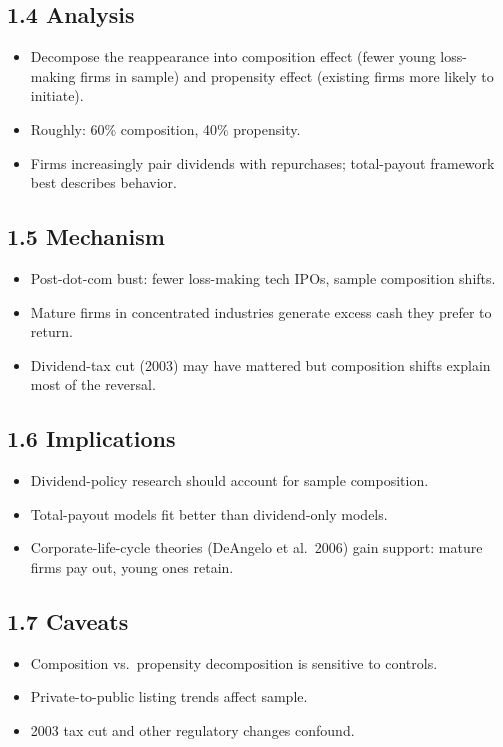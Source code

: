\documentclass[11pt]{article}
\begin{document}
\subsection*{1.4 Analysis}
\begin{itemize}
\item Decompose the reappearance into composition effect (fewer young loss-making firms in sample) and propensity effect (existing firms more likely to initiate).
\item Roughly: 60\% composition, 40\% propensity.
\item Firms increasingly pair dividends with repurchases; total-payout framework best describes behavior.
\end{itemize}

\subsection*{1.5 Mechanism}
\begin{itemize}
\item Post-dot-com bust: fewer loss-making tech IPOs, sample composition shifts.
\item Mature firms in concentrated industries generate excess cash they prefer to return.
\item Dividend-tax cut (2003) may have mattered but composition shifts explain most of the reversal.
\end{itemize}

\subsection*{1.6 Implications}
\begin{itemize}
\item Dividend-policy research should account for sample composition.
\item Total-payout models fit better than dividend-only models.
\item Corporate-life-cycle theories (DeAngelo et al.\ 2006) gain support: mature firms pay out, young ones retain.
\end{itemize}

\subsection*{1.7 Caveats}
\begin{alertbox}
\begin{itemize}
\item Composition vs.\ propensity decomposition is sensitive to controls.
\item Private-to-public listing trends affect sample.
\item 2003 tax cut and other regulatory changes confound.
\end{itemize}
\end{alertbox}
\end{document}
